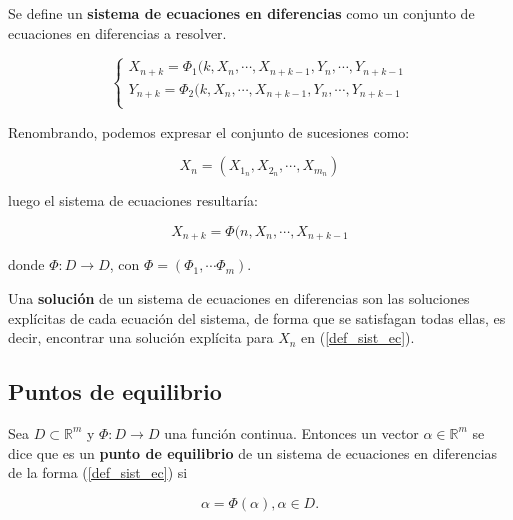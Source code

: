 \begin{definition}
Se define un \textbf{sistema de ecuaciones en diferencias} como un conjunto de ecuaciones en diferencias a resolver.

\begin{equation}
\begin{cases}
X_{n+k} = \Phi_1(k, X_n, \cdots , X_{n+k-1}, Y_n, \cdots, Y_{n+k-1} \\
Y_{n+k} = \Phi_2(k, X_n, \cdots , X_{n+k-1}, Y_n, \cdots, Y_{n+k-1} \\
\end{cases}
\end{equation}

Renombrando, podemos expresar el conjunto de sucesiones como:

\begin{equation}
X_n = (X_{1_n}, X_{2_n}, \cdots , X_{m_n})
\end{equation}

luego el sistema de ecuaciones resultaría:

\begin{equation}
\label{def_sist_ec}
X_{n+k} = \Phi (n, X_n, \cdots , X_{n+k-1}
\end{equation}


donde $\Phi : D \rightarrow D$, con $\Phi = (\Phi_1, \cdots \Phi_m)$.

\end{definition}

\begin{definition}
Una \textbf{solución} de un sistema de ecuaciones en diferencias son las soluciones explícitas de cada ecuación del sistema, de forma que se satisfagan todas ellas, es decir, encontrar una solución explícita para $X_n$ en (\ref{def_sist_ec}).
\end{definition}

\subsection{Puntos de equilibrio}

\begin{definition}
Sea $D\subset \mathbb{R}^m$ y $\Phi :D\rightarrow D$ una función continua. Entonces un vector $\alpha \in \mathbb{R}^m$ se dice que es un \textbf{punto de equilibrio} de un sistema de ecuaciones en diferencias de la forma (\ref{def_sist_ec}) si

$$\alpha = \Phi (\alpha), \alpha \in D.$$
\end{definition}

